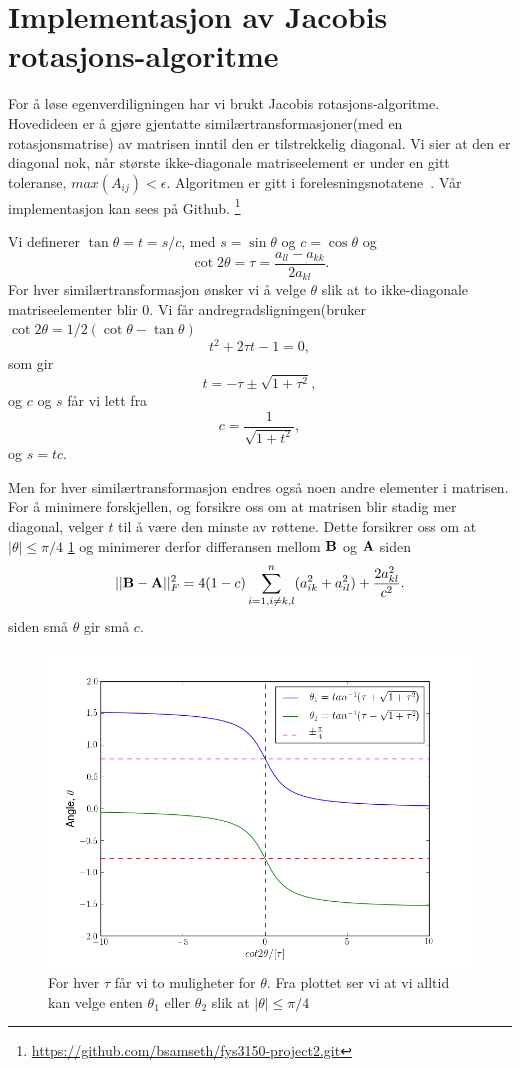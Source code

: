 \documentclass[11pt]{article}
\begin{document}
\section{Implementasjon av Jacobis rotasjons-algoritme}
For å løse egenverdiligningen har vi brukt Jacobis rotasjons-algoritme. 
Hovedideen er å gjøre gjentatte similærtransformasjoner(med en rotasjonsmatrise) av 
matrisen inntil den er tilstrekkelig diagonal. Vi sier at den er diagonal nok, når største 
ikke-diagonale matriseelement er under en gitt toleranse,  $ max(A_{ij}) < \epsilon$. Algoritmen er gitt
i forelesningsnotatene~\cite[seksjon 7.4, side 215]{Lecture-notes}. Vår implementasjon kan sees på Github. \footnote{\url{https://github.com/bsamseth/fys3150-project2.git}}


Vi definerer $\tan\theta = t= s/c$, med $s=\sin\theta$ og $c=\cos\theta$ og
\[\cot 2\theta=\tau = \frac{a_{ll}-a_{kk}}{2a_{kl}}.
\]
For hver similærtransformasjon ønsker vi å velge $\theta$ slik at to ikke-diagonale matriseelementer blir 0. 
 Vi får andregradsligningen(bruker $\cot 2\theta=1/2(\cot \theta-\tan\theta)$
\[
t^2+2\tau t-1= 0,
\]
som gir 
\[
  t = -\tau \pm \sqrt{1+\tau^2},
\]
og $c$ og $s$ får vi lett fra
\[
   c = \frac{1}{\sqrt{1+t^2}},
\]
og $s=tc$. 

Men for hver similærtransformasjon endres også noen andre elementer i matrisen. For 
å minimere forskjellen, og forsikre oss om at matrisen blir stadig mer diagonal, 
velger $t$ til å være den minste av røttene. Dette forsikrer oss om at $|\theta| \le \pi/4$ \ref{fig:theta} og minimerer derfor differansen mellom ${\bf B}$ og ${\bf A}$ siden
\[
||{\bf B}-{\bf A}||_F^2=4(1-c)\sum_{i=1,i\ne k,l}^n(a_{ik}^2+a_{il}^2) +\frac{2a_{kl}^2}{c^2}.
\]
siden små $\theta$ gir små $c$.

\begin{figure}[ht]
  \centering
  \includegraphics[scale=0.7]{fig/theta.png}
  \caption{\label{fig:theta} For hver $\tau$ får vi to muligheter for $\theta$. Fra plottet ser vi at vi alltid kan velge enten $\theta_1$ eller $\theta_2$ slik at $|\theta| \le \pi/4$ }
\end{figure}
\end{document}
